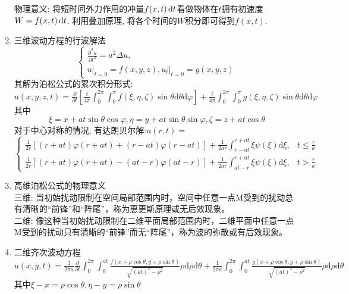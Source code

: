 \documentclass[UTF8,8pt]{ctexart}
\begin{document}
\begin{multicols}{2}
\begin{enumerate}
    物理意义: 将短时间外力作用的冲量$f(x,t)\mathop{}\!\mathrm{d} t$看做物体在$t$拥有初速度$W = f(x,t)\mathop{}\!\mathrm{d} t$. 利用叠加原理, 将各个时间的$W$积分即可得到$f(x,t)$.
    \item 三维波动方程的行波解法
    $$\left\{\begin{array}{ll}{\frac{\partial^{2} u}{\partial t^{2}}=a^{2} \Delta u,}  \\ {\left.u\right|_{t=0}=f(x, y, z),\left.u_{t}\right|_{t=0}=g(x, y, z)}\end{array}\right.$$
    其解为泊松公式的累次积分形式:\\
    $ u(x,y,z,t)
    =\frac{\partial}{\partial t}\left[\frac{t}{4 \pi} \int_{0}^{2 \pi} \int_{0}^{\pi} f(\xi, \eta, \zeta) \sin \theta \mathrm{d} \theta \mathrm{d} \varphi\right]+\frac{t}{4 \pi} \int_{0}^{2 \pi} \int_{0}^{\pi} g(\xi, \eta, \zeta) \sin \theta \mathrm{d} \theta \mathrm{d} \varphi
    $
    其中$$ 
    \xi=x+a t \sin \theta \cos \varphi, \eta=y+a t \sin \theta \sin \varphi, \zeta=z+a t \cos \theta
    $$
    对于中心对称的情况, 有达朗贝尔解:$u(r, t)=$
    $$ 
    \left\{\begin{array}{ll}{\frac{1}{2 r}[(r+a t) \varphi(r+a t)+(r-a t) \varphi(r-a t)]+\frac{1}{2 a r} \int_{r-a t}^{r+a t} \xi \psi(\xi) \mathrm{d} \xi,} & {t \leq \frac{r}{a}} \\ {\frac{1}{2 r}[(r+a t) \varphi(r+a t)-(a t-r) \varphi(a t-r)]+\frac{1}{2 a r} \int_{a t-r}^{r+a t} \xi \psi(\xi) \mathrm{d} \xi,} & {t>\frac{r}{a}}\end{array}\right.
    $$
    \item 高维泊松公式的物理意义\\
    三维: 当初始扰动限制在空间局部范围内时，空间中任意一点M受到的扰动总有清晰的“前锋”和“阵尾”，称为惠更斯原理或无后效现象。\\
    二维: 像这种当初始扰动限制在二维平面局部范围内时，二维平面中任意一点M受到的扰动只有清晰的“前锋”而无“阵尾”，称为波的弥散或有后效现象。
    \item 二维齐次波动方程\\
    $
    u(x, y, t)=\frac{1}{2 \pi a} \frac{\partial}{\partial t} \int_{0}^{2 \pi} \int_{0}^{at} \frac{f(x+\rho \cos \theta, y+\rho \sin \theta)}{\sqrt{(at)^{2}-\rho^{2}}} \rho \mathrm{d} \rho \mathrm{d} \theta+\frac{1}{2 \pi a} \int_{0}^{2 \pi} \int_{0}^{a t} \frac{g(x+\rho \cos \theta, y+\rho \sin \theta)}{\sqrt{(at)^{2}-\rho^{2}}} \rho \mathrm{d} \rho \mathrm{d} \theta
    $\\
    其中$\xi-x=\rho \cos \theta, \eta-y=\rho \sin \theta$
    \end{enumerate}

\end{multicols}
\end{document}
